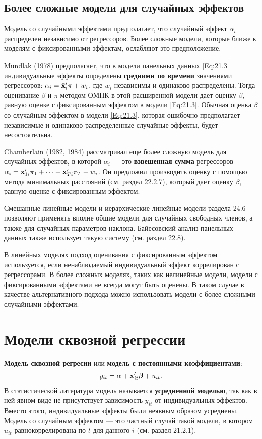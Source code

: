 \subsection{Более сложные модели для случайных эффектов}

Модель со случайными эффектами предполагает, что случайный эффект $\alpha_i$ распределен независимо от регрессоров. Более сложные модели, которые ближе к моделям с фиксированными эффектам, ослабляют это предположение. 

Mundlak (1978) предполагает, что в модели панельных данных \ref{Eq:21.3} индивидуальные эффекты определены \textbf{средними по времени} значениями регрессоров: $\alpha_i=\bar{\mathbf{x}}'_i\pi+w_i$, где $w_i$ независимы и одинаково распределены. Тогда оценивание $\beta$ и $\pi$ методом ОМНК в этой расширенной модели дает оценку $\beta$, равную оценке с фиксированным эффектом в модели \ref{Eq:21.3}. Обычная оценка $\beta$ со случайным эффектом в модели \ref{Eq:21.3}, которая ошибочно предполагает независимые и одинаково распределенные случайные эффекты, будет несостоятельна.

Chamberlain (1982, 1984) рассматривал еще более сложную модель для случайных эффектов, в которой $\alpha_i$ --- это \textbf{взвешенная сумма} регрессоров $\alpha_i=\mathbf{x}'_{1i}\pi_1+ \dots + \mathbf{x}'_{Ti} \pi_T+w_i$. Он предложил производить оценку с помощью метода минимальных расстояний (см. раздел 22.2.7), который дает оценку  $\beta$, равную оценке с фиксированным эффектом.

Смешанные линейные модели  и иерархические линейные модели раздела 24.6 позволяют применять вполне общие модели для случайных свободных членов, а также для случайных параметров наклона. Байесовский анализ панельных данных также использует такую систему (см. раздел 22.8).

В линейных моделях подход оценивания с фиксированным эффектом используется, если ненаблюдаемый индивидуальный эффект коррелирован с регрессорами. В более сложных моделях, таких как нелинейные модели, модели с фиксированными эффектами не всегда могут быть оценены. В таком случае в качестве альтернативного подхода можно использовать модели с более сложными случайными эффектами.

\section{Модели сквозной регрессии}

\textbf{Модель сквозной регресии} или \textbf{модель с постоянными коэффициентами}:
\begin{align}
y_{it}=\alpha+\mathbf{x}'_{it}\bm\beta + u_{it}.
\label{Eq:21.17}
\end{align}
В статистической литература модель называется \textbf{усредненной моделью}, так как в ней явном виде не присутствует зависимость $y_{it}$ от индивидуальных эффектов. Вместо этого, индивидуальные эффекты были неявным образом усреднены. Модель со случайным эффектом  --- это частный случай такой модели, в котором $u_{it}$ равнокоррелирована по $t$ для данного $i$ (см. раздел 21.2.1).

